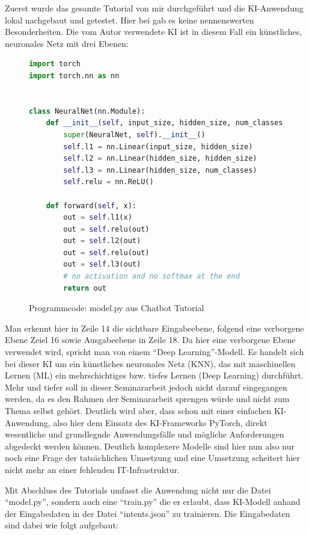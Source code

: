 \documentclass[12pt,oneside,titlepage,listof=totoc,bibliography=totoc]{scrartcl}
\begin{document}
Zuerst wurde das gesamte Tutorial von mir durchgeführt und die KI-Anwendung lokal nachgebaut und getestet. Hier bei gab es keine nennenswerten Besonderheiten. Die vom Autor verwendete KI ist in diesem Fall ein künstliches, neuronales Netz mit drei Ebenen:

\begin{figure}[H]
	\caption{Programmcode: model.py aus Chatbot Tutorial}
	\label{fig:code-nn-basis}
\begin{lstlisting}[language=python]
import torch
import torch.nn as nn


class NeuralNet(nn.Module):
    def __init__(self, input_size, hidden_size, num_classes):
        super(NeuralNet, self).__init__()
        self.l1 = nn.Linear(input_size, hidden_size) 
        self.l2 = nn.Linear(hidden_size, hidden_size) 
        self.l3 = nn.Linear(hidden_size, num_classes)
        self.relu = nn.ReLU()
    
    def forward(self, x):
        out = self.l1(x)
        out = self.relu(out)
        out = self.l2(out)
        out = self.relu(out)
        out = self.l3(out)
        # no activation and no softmax at the end
        return out
\end{lstlisting}
\end{figure}

Man erkennt hier in Zeile 14 die sichtbare Eingabeebene, folgend eine verborgene Ebene Zeiel 16 sowie Ausgabeebene in Zeile 18. Da hier eine verborgene Ebene verwendet wird, spricht man von einem \enquote{Deep Learning}-Modell. Es handelt sich bei dieser \acl{KI} um ein künstliches neuronales Netz (KNN), das mit maschinellen Lernen (ML) ein mehrschichtiges bzw. tiefes Lernen (Deep Learning) durchführt. Mehr und tiefer soll in dieser Seminararbeit jedoch nicht darauf eingegangen werden, da es den Rahmen der Seminararbeit sprengen würde und nicht zum Thema selbst gehört. Deutlich wird aber, dass schon mit einer einfachen KI-Anwendung, also hier dem Einsatz des KI-Frameworks PyTorch, direkt wesentliche und grundlegnde Anwendungsfälle und mögliche Anforderungen abgedeckt werden können. Deutlich komplexere Modelle sind hier nun also nur noch eine Frage der tatsächlichen Umsetzung und eine Umsetzung scheitert hier nicht mehr an einer fehlenden IT-Infrastruktur.

Mit Abschluss des Tutorials umfasst die Anwendung nicht nur die Datei \enquote{model.py}, sondern auch eine \enquote{train.py} die er erlaubt, dass KI-Modell anhand der Eingabedaten in der Datei \enquote{intents.json} zu trainieren. Die Eingabedaten sind dabei wie folgt aufgebaut:
\end{document}

